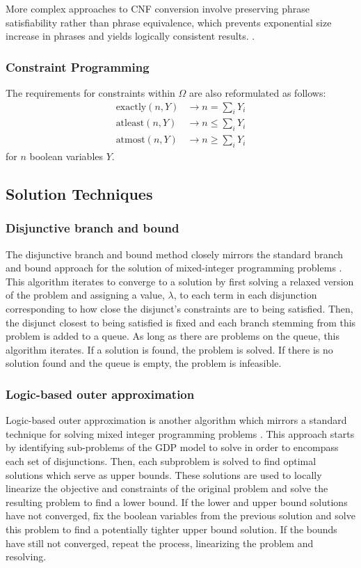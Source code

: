 \documentclass{juliacon}
\begin{document}
More complex approaches to CNF conversion involve preserving phrase satisfiability rather than phrase equivalence, which prevents exponential size increase in phrases and yields logically consistent results. \cite{jackson_sheridan_2005}.
\vskip 6pt

\subsubsection{Constraint Programming}
The requirements for constraints within $\Omega$ are also reformulated as follows:
\vskip 6pt
\begin{align*}
    \text{exactly}(n, Y) & \rightarrow n = \sum_i Y_i \\
    \text{atleast}(n, Y) & \rightarrow n \leq \sum_i Y_i \\
    \text{atmost}(n, Y) & \rightarrow n \geq \sum_i Y_i
\end{align*}
\vskip 6pt
for $n$ boolean variables $Y$.
\vskip 6pt

\subsection{Solution Techniques}

\subsubsection{Disjunctive branch and bound}
The disjunctive branch and bound method closely mirrors the standard branch and bound approach for the solution of mixed-integer programming problems \cite{grossmann_lee_2003}. This algorithm iterates to converge to a solution by first solving a relaxed version of the problem and assigning a value, $\lambda$, to each term in each disjunction corresponding to how close the disjunct's constraints are to being satisfied. Then, the disjunct closest to being satisfied is fixed and each branch stemming from this problem is added to a queue. As long as there are problems on the queue, this algorithm iterates. If a solution is found, the problem is solved. If there is no solution found and the queue is empty, the problem is infeasible.
\vskip 6pt

\subsubsection{Logic-based outer approximation}
Logic-based outer approximation is another algorithm which mirrors a standard technique for solving mixed integer programming problems \cite{E.Grossmann2009}. This approach starts by identifying sub-problems of the GDP model to solve in order to encompass each set of disjunctions. Then, each subproblem is solved to find optimal solutions which serve as upper bounds. These solutions are used to locally linearize the objective and constraints of the original problem and solve the resulting problem to find a lower bound. If the lower and upper bound solutions have not converged, fix the boolean variables from the previous solution and solve this problem to find a potentially tighter upper bound solution. If the bounds have still not converged, repeat the process, linearizing the problem and resolving.
\vskip 6pt
\end{document}
